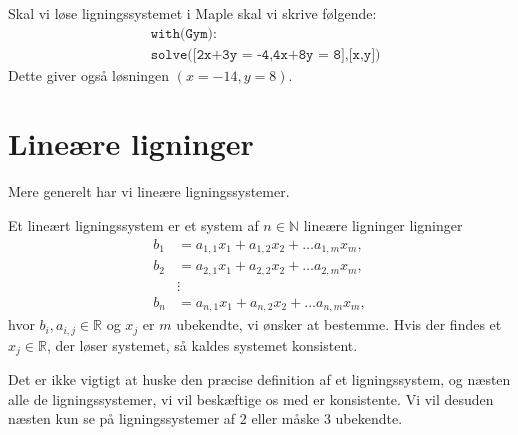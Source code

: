 \begin{exa}
	Skal vi løse ligningssystemet i Maple skal vi skrive følgende:
	\begin{align*}
		&\texttt{with(Gym):}\\
		&\texttt{solve([2x+3y = -4,4x+8y = 8],[x,y])}
	\end{align*}
	Dette giver også løsningen $(x = -14, y = 8)$.
\end{exa}

\section*{Lineære ligninger}
Mere generelt har vi lineære ligningssystemer. 
\begin{defn}
Et lineært ligningssystem er et system af $n\in \mathbb{N}$ lineære ligninger ligninger
\begin{align*}
b_1&= a_{1,1}x_1+a_{1,2}x_2+\hdots a_{1,m}x_m, \\
b_2&= a_{2,1}x_1+a_{2,2}x_2+\hdots a_{2,m}x_m,\\
&\vdots\\
b_n&= a_{n,1}x_1+a_{n,2}x_2+\hdots a_{n,m}x_m,
\end{align*}
hvor $b_i,a_{i,j}\in \mathbb{R}$ og $x_j$ er $m$ ubekendte, vi ønsker at bestemme. Hvis der findes et $x_j \in \mathbb{R}$, der løser systemet, så kaldes systemet konsistent.
\end{defn}
Det er ikke vigtigt at huske den præcise definition af et ligningssystem, og næsten alle de ligningssystemer, vi vil beskæftige os med er konsistente. Vi vil desuden næsten kun se på ligningssystemer af $2$ eller måske $3$ ubekendte. 

